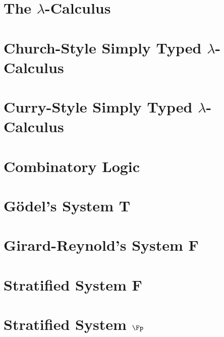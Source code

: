 \documentclass[phd,appendix,dedicationpage,ackpage,epigraphpage,figures]{uithesis}
\begin{document}
\section*{The $\lambda$-Calculus}
\label{sec:the_lambda-calculus}
\Lamall{}

\newpage
\section*{Church-Style Simply Typed $\lambda$-Calculus}
\label{sec:church_style_simply_typed_lambda-calculus}
\CHSTLCall{}

\newpage
\section*{Curry-Style Simply Typed $\lambda$-Calculus}
\label{sec:curry_style_simply_typed_lambda-calculus}
\CSTLCall{}

\newpage
\section*{Combinatory Logic}
\label{sec:combinatory_logic}
\Comball{}

\newpage
\section*{G\"odel's System T}
\label{sec:godels_system_t}
\Tall{}

\newpage
\section*{Girard-Reynold's System F}
\label{sec:girard-reynolds_system_f}
\Fall{}

\newpage
\section*{Stratified System F}
\label{sec:stratified_system_f}
\SSFall{}

\newpage
\section*{Stratified System $\Fp$}
\label{sec:stratified_system_f+}
{\scriptsize \SSFpall{}}
\end{document}
